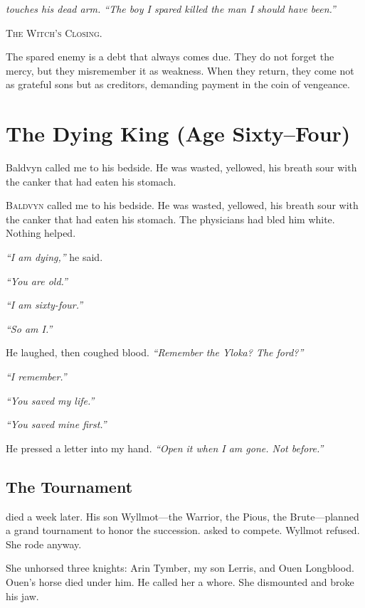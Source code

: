 \documentclass[11pt,a5paper]{book}
\newenvironment{witchclosing}
  {\begin{quoting}[font={small\itshape}, leftmargin=2em, rightmargin=2em]\noindent\textsc{The Witch's Closing.}\par}
  {\end{quoting}}
\begin{document}
\vspace{1em}
\noindent\textit{\braedon{} touches his dead arm. ``The boy I spared killed the man I should have been.''}

\begin{witchclosing}
The spared enemy is a debt that always comes due. They do not forget the mercy, but they misremember it as weakness. When they return, they come not as grateful sons but as creditors, demanding payment in the coin of vengeance.
\end{witchclosing}

\clearpage

\chapter{The Dying King (Age Sixty--Four)}

\epigraph{Baldvyn called me to his bedside. He was wasted, yellowed, his breath sour with the canker that had eaten his stomach.}{\braedon}

\lettrine{B}{aldvyn} called me to his bedside. He was wasted, yellowed, his breath sour with the canker that had eaten his stomach. The physicians had bled him white. Nothing helped.

\textit{``I am dying,''} he said.

\textit{``You are old.''}

\textit{``I am sixty-four.''}

\textit{``So am I.''}

He laughed, then coughed blood. \textit{``Remember the Yloka? The ford?''}

\textit{``I remember.''}

\textit{``You saved my life.''}

\textit{``You saved mine first.''}

He pressed a letter into my hand. \textit{``Open it when I am gone. Not before.''}

\section*{The Tournament}
\baldvyn{} died a week later. His son Wyllmot---the Warrior, the Pious, the Brute---planned a grand tournament to honor the succession. \veralyn{} asked to compete. Wyllmot refused. She rode anyway.

She unhorsed three knights: Arin Tymber, my son Lerris, and Ouen Longblood. Ouen's horse died under him. He called her a whore. She dismounted and broke his jaw.
\end{document}
